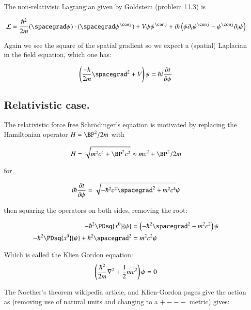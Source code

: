 \documentclass{article}
\begin{document}
The non-relativisic Lagrangian given by Goldstein (problem 11.3) is

\begin{align}
\LL = \frac{\hbar^2}{2m}
(\spacegrad \psi) \cdot (\spacegrad \psi^\conj) + V \psi \psi^\conj + {i \hbar} \left( \psi \partial_t \psi^\conj - \psi^\conj \partial_t \psi \right)
\end{align}

Again we see the square of the spatial gradient so we expect a (spatial) Laplacian
in the field equation, which one has:

\begin{align*}
\left( \frac{-\hbar}{2m} \spacegrad^2 + V \right) \psi = \hbar i \PD{t}{\psi}
\end{align*}

\subsection{ Relativistic case. }

The relativistic force free Schr\"{o}dinger's equation is motivated by \cite{srednicki2007qft} replacing the Hamiltonian operator $H = \BP^2/{2 m}$ with

\begin{align*}
H = \sqrt{m^2 c^4 + \BP^2 c^2} \approx m c^2 + \BP^2/2m
\end{align*}

for

\begin{align*}
i \hbar \PD{t}{\psi} = \sqrt{ -\hbar^2 c^2 \spacegrad^2 + m^2 c^4} \psi
\end{align*}

then squaring the operators on both sides, removing the root:

\begin{align*}
- \hbar^2 \PDsq{x^0}{\psi} &= \left(-\hbar^2 \spacegrad^2 + m^2 c^2 \right) \psi \\
- \hbar^2 \PDsq{x^0}{\psi} + \hbar^2 \spacegrad^2 &= m^2 c^2 \psi \\
\end{align*}

Which is called the Klien Gordon equation:
\begin{align*}
\left(\frac{\hbar^2}{2m} \nabla^2 + \frac{1}{2} m c^2\right) \psi = 0 \\
\end{align*}

The Noether's theorem wikipedia article, and Klien-Gordon pages give the action
as (removing use of natural units and changing to a $+---$ metric) gives:
\end{document}
